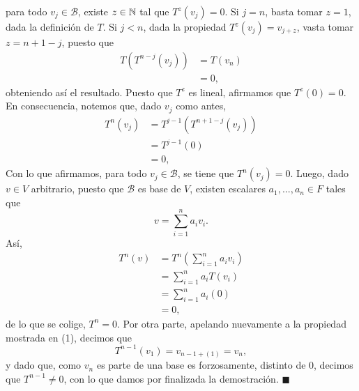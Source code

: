 \documentclass[11pt]{scrartcl}
\begin{document}
para todo $v_j \in \mathcal{B}$, existe $z\in \mathbb N$ tal que $T^z(v_j)=0$. Si $j=n$, basta tomar $z=1$, dada la definición de $T$. Si $j<n$,
dada la propiedad $T^z(v_j)=v_{j+z}$, vasta tomar $z=n+1-j$, puesto que
\begin{align*}
    T(T^{n-j}(v_j)) &= T(v_n) \\
    &= 0,
\end{align*}
obteniendo así el resultado. Puesto que $T^z$ es lineal, afirmamos que $T^z(0)=0$. En consecuencia, notemos que, dado $v_j$ como antes,
\begin{align*}
    T^n(v_j) &= T^{j-1}(T^{n+1-j}(v_j)) \\
        &= T^{j-1}(0) \\
        &= 0,
\end{align*}
Con lo que afirmamos, para todo $v_j \in \mathcal{B}$, se tiene que $T^n(v_j)=0$. Luego, dado $v \in V$ arbitrario, puesto que $\mathcal{B}$ es base de $V$, existen escalares
$a_1,...,a_n \in F$ tales que
\[
v=\sum_{i=1}^{n}a_iv_i.
\]
Así,
\begin{align*}
    T^n\left(v\right) &= T^n\left(\sum_{i=1}^{n}a_iv_i\right) \\
    &= \sum_{i=1}^{n}a_iT(v_i) \\
    &= \sum_{i=1}^{n}a_i(0) \\
    &= 0,
\end{align*}
de lo que se colige, $T^n=0$. Por otra parte, apelando nuevamente a la propiedad mostrada en (1), decimos que
\[
T^{n-1}(v_1) = v_{n-1+(1)}=v_n,
\]
y dado que, como $v_n$ es parte de una base es forzosamente, distinto de 0, decimos que $T^{n-1}\neq 0$, con lo que damos por finalizada la demostración. $\blacksquare$
\end{document}

